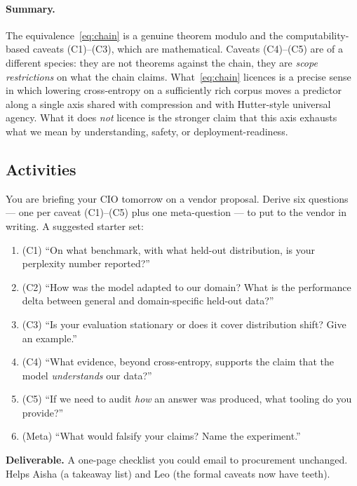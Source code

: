 \paragraph{Summary.}
The equivalence~\eqref{eq:chain} is a genuine theorem modulo
 and the computability-based
caveats (C1)--(C3), which are mathematical. Caveats (C4)--(C5) are
of a different species: they are not theorems against the chain,
they are \emph{scope restrictions} on what the chain claims.
What~\eqref{eq:chain} licences is a precise sense in which lowering
cross-entropy on a sufficiently rich corpus moves a predictor along
a single axis shared with compression and with Hutter-style
universal agency. What it does \emph{not} licence is the stronger
claim that this axis exhausts what we mean by understanding, safety,
or deployment-readiness.

\subsection*{Activities}
\label{sec:caveats-activities}

\begin{activity}[title={Activity 8.1 --- Procurement checklist}]
You are briefing your CIO tomorrow on a vendor proposal. Derive six
questions --- one per caveat (C1)--(C5) plus one meta-question ---
to put to the vendor in writing. A suggested starter set:

\begin{enumerate}[leftmargin=1.4em,itemsep=2pt]
  \item (C1) ``On what benchmark, with what held-out distribution, is
        your perplexity number reported?''
  \item (C2) ``How was the model adapted to our domain? What is the
        performance delta between general and domain-specific
        held-out data?''
  \item (C3) ``Is your evaluation stationary or does it cover
        distribution shift? Give an example.''
  \item (C4) ``What evidence, beyond cross-entropy, supports the
        claim that the model \emph{understands} our data?''
  \item (C5) ``If we need to audit \emph{how} an answer was produced,
        what tooling do you provide?''
  \item (Meta) ``What would falsify your claims? Name the
        experiment.''
\end{enumerate}

\textbf{Deliverable.} A one-page checklist you could email to
procurement unchanged. Helps Aisha (a takeaway list) and Leo (the
formal caveats now have teeth).
\end{activity}

